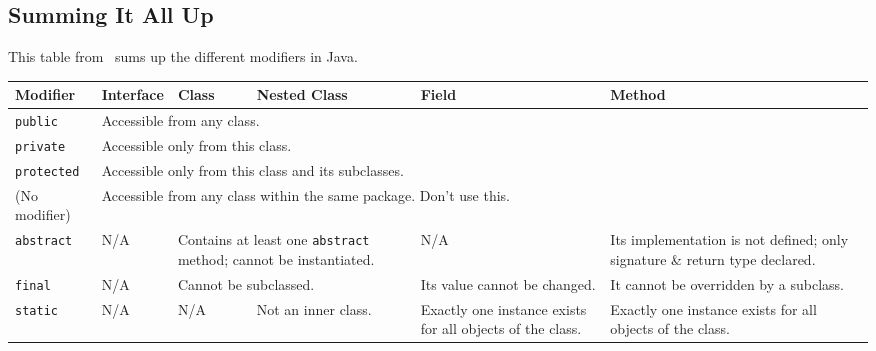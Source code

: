 \subsection*{Summing It All Up}

This table from~\cite{dswj} sums up the different modifiers in Java.
\vspace{-2em}

\begin{center}
\begin{tabular}{|p{3cm}|p{2cm}|p{2cm}|p{2cm}|p{2cm}|p{4cm}|}
\hline
\textbf{Modifier} & \textbf{Interface} & \textbf{Class} & \textbf{Nested Class} & \textbf{Field} & \textbf{Method} \\
\hline
\texttt{public} & \multicolumn{5}{l|}{Accessible from any class.}\\
\hline
\texttt{private} & \multicolumn{5}{l|}{Accessible only from this class.}\\
\hline
\texttt{protected} & \multicolumn{5}{l|}{Accessible only from this class and its subclasses.}\\
\hline
(No modifier) & \multicolumn{5}{l|}{Accessible from any class within the same package. Don't use this.}\\
\hline
\hline
\texttt{abstract} & N/A & \multicolumn{2}{p{4cm}|}{Contains at least one \texttt{abstract} method; cannot be instantiated.} & N/A & Its implementation is not defined; only signature \& return type declared.\\
\hline
\texttt{final} & N/A & \multicolumn{2}{l|}{Cannot be subclassed.} & Its value cannot be changed. & It cannot be overridden by a subclass. \\
\hline
\texttt{static} & N/A & N/A & Not an inner class. & Exactly one instance exists for all objects of the class. & Exactly one instance exists for all objects of the class. \\
\hline

\end{tabular}
\end{center}





